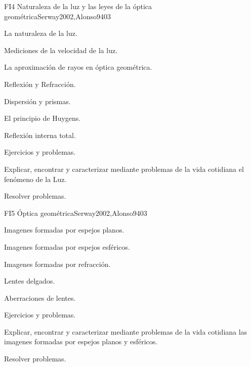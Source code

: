 \begin{syllabus}
\begin{unit}{FI4 Naturaleza de la luz y las leyes de la óptica geométrica}{}{Serway2002,Alonso94}{0}{3}
\begin{topics}
      \item La naturaleza de la luz.
        \item Mediciones de la velocidad de la luz.
        \item La aproximación de rayos en óptica geométrica.
        \item Reflexión y Refracción.
        \item Dispersión y prismas.
        \item El principio de Huygens.
        \item Reflexión interna total.
        \item Ejercicios y problemas.
   \end{topics}

   \begin{learningoutcomes}
      \item Explicar, encontrar y caracterizar mediante problemas de la vida cotidiana el fenómeno de la Luz.
      \item Resolver problemas.
      \end{learningoutcomes}
\end{unit}

\begin{unit}{FI5 Óptica geométrica}{}{Serway2002,Alonso94}{0}{3}
\begin{topics}
      \item Imagenes formadas por espejos planos.
        \item Imagenes formadas por espejos esféricos.
        \item Imagenes formadas por refracción.
        \item Lentes delgados.
        \item Aberraciones de lentes.
        \item Ejercicios y problemas.
      \end{topics}

   \begin{learningoutcomes}
      \item Explicar, encontrar y caracterizar mediante problemas de la vida cotidiana las imagenes formadas por espejos planos y esféricos.
      \item Resolver problemas.
   \end{learningoutcomes}
\end{unit}


\end{syllabus}
